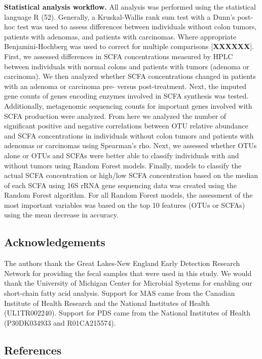 \documentclass[11pt,]{article}
\begin{document}
\textbf{Statistical analysis workflow.} All analysis was performed using
the statistical language R (52). Generally, a Kruskal-Wallis rank sum
test with a Dunn's post-hoc test was used to assess differences between
individuals without colon tumors, patients with adenomas, and patients
with carcinomas. Where appropriate Benjamini-Hochberg was used to
correct for multiple comparisons {[}\textbf{XXXXXX}{]}. First, we
assessed differences in SCFA concentrations measured by HPLC between
individuals with normal colons and patients with tumors (adenoma or
carcinoma). We then analyzed whether SCFA concentrations changed in
patients with an adenoma or carcinoma pre- versus post-treatment. Next,
the imputed gene counts of genes encoding enzymes involved in SCFA
synthesis was tested. Additionally, metagenomic sequencing counts for
important genes involved with SCFA production were analyzed. From here
we analyzed the number of significant positive and negative correlations
between OTU relative abundance and SCFA concentrations in individuals
without colon tumors and patients with adenomas or carcinomas using
Spearman's rho. Next, we assessed whether OTUs alone or OTUs and SCFAs
were better able to classify individuals with and without tumors using
Random Forest models. Finally, models to classify the actual SCFA
concentration or high/low SCFA concentration based on the median of each
SCFA using 16S rRNA gene sequencing data was created using the Random
Forest algorithm. For all Random Forest models, the assessment of the
most important variables was based on the top 10 features (OTUs or
SCFAs) using the mean decrease in accuracy.

\newpage

\hypertarget{acknowledgements}{%
\subsection{Acknowledgements}\label{acknowledgements}}

The authors thank the Great Lakes-New England Early Detection Research
Network for providing the fecal samples that were used in this study. We
would thank the University of Michigan Center for Microbial Systems for
enabling our short-chain fatty acid analysis. Support for MAS came from
the Canadian Institute of Health Research and the National Institutes of
Health (UL1TR002240). Support for PDS came from the National Institutes
of Health (P30DK034933 and R01CA215574).

\newpage

\hypertarget{references}{%
\subsection{References}\label{references}}
\end{document}
